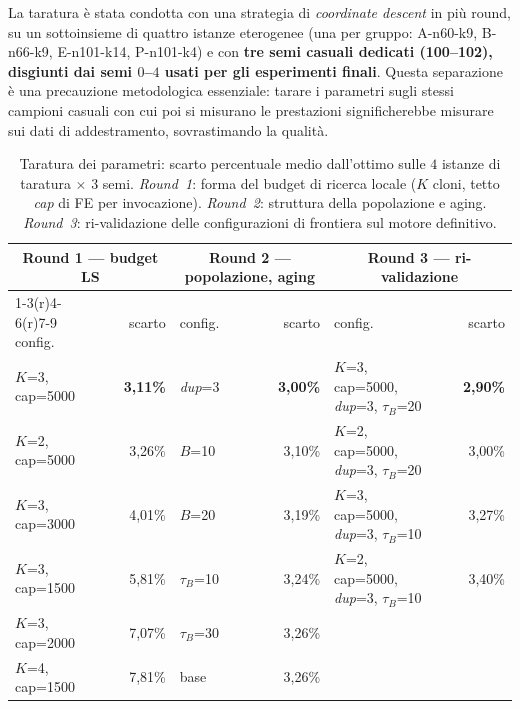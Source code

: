 \documentclass[10pt,a4paper]{article}
\begin{document}
La taratura è stata condotta con una strategia di \emph{coordinate descent} in
più round, su un sottoinsieme di quattro istanze eterogenee (una per gruppo:
A-n60-k9, B-n66-k9, E-n101-k14, P-n101-k4) e con \textbf{tre semi casuali
dedicati (100--102), disgiunti dai semi $0$--$4$ usati per gli esperimenti
finali}. Questa separazione è una precauzione metodologica essenziale: tarare i
parametri sugli stessi campioni casuali con cui poi si misurano le prestazioni
significherebbe misurare sui dati di addestramento, sovrastimando la qualità.

\begin{table}[H]
\centering
\small
\caption{Taratura dei parametri: scarto percentuale medio dall'ottimo sulle
$4$ istanze di taratura $\times$ $3$ semi. \emph{Round~1}: forma del budget di
ricerca locale ($K$ cloni, tetto \emph{cap} di FE per invocazione).
\emph{Round~2}: struttura della popolazione e aging. \emph{Round~3}:
ri-validazione delle configurazioni di frontiera sul motore definitivo.}
\label{tab:tuning}
\begin{tabular}{llr@{\hskip 14pt}llr@{\hskip 14pt}llr}
\toprule
\multicolumn{3}{c}{\textbf{Round 1} --- budget LS} &
\multicolumn{3}{c}{\textbf{Round 2} --- popolazione, aging} &
\multicolumn{3}{c}{\textbf{Round 3} --- ri-validazione} \\
\cmidrule(r){1-3}\cmidrule(r){4-6}\cmidrule(r){7-9}
config. & & scarto & config. & & scarto & config. & & scarto \\
\midrule
$K$=3, cap=5000 & & \textbf{3,11\%} & \emph{dup}=3      & & \textbf{3,00\%} & $K$=3, cap=5000, \emph{dup}=3, $\tau_B$=20 & & \textbf{2,90\%} \\
$K$=2, cap=5000 & & 3,26\%          & $B$=10            & & 3,10\%          & $K$=2, cap=5000, \emph{dup}=3, $\tau_B$=20 & & 3,00\% \\
$K$=3, cap=3000 & & 4,01\%          & $B$=20            & & 3,19\%          & $K$=3, cap=5000, \emph{dup}=3, $\tau_B$=10 & & 3,27\% \\
$K$=3, cap=1500 & & 5,81\%          & $\tau_B$=10       & & 3,24\%          & $K$=2, cap=5000, \emph{dup}=3, $\tau_B$=10 & & 3,40\% \\
$K$=3, cap=2000 & & 7,07\%          & $\tau_B$=30       & & 3,26\%          & & & \\
$K$=4, cap=1500 & & 7,81\%          & base              & & 3,26\%          & & & \\
\bottomrule
\end{tabular}
\end{table}
\end{document}
